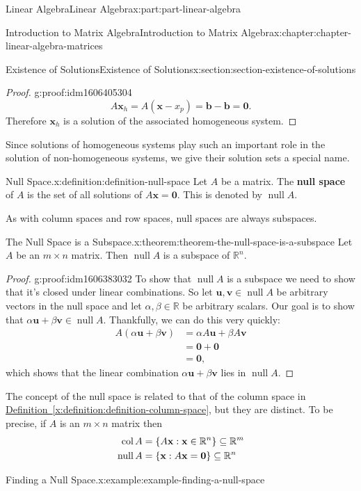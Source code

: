 \documentclass[twoside,10pt,]{book}
\newcommand{\xreffont}{\relax}
\newcommand{\terminology}[1]{\textbf{#1}}
\numberwithin{equation}{part}
\newcommand{\RR}{\mathbb{R}}
\providecommand{\vb}[1]{\mathbf{#1}}
\newcommand{\col}[1]{\operatorname{col}{#1}}
\newcommand{\nul}[1]{\operatorname{null}{#1}}
\begin{document}
\begin{partptx}{Linear Algebra}{}{Linear Algebra}{}{}{x:part:part-linear-algebra}
\begin{chapterptx}{Introduction to Matrix Algebra}{}{Introduction to Matrix Algebra}{}{}{x:chapter:chapter-linear-algebra-matrices}
\begin{sectionptx}{Existence of Solutions}{}{Existence of Solutions}{}{}{x:section:section-existence-of-solutions}
\begin{proof}{}{g:proof:idm1606405304}
\begin{equation*}
A\vb{x}_{h} = A(\vb{x}-x_{p}) = \vb{b} - \vb{b} = \vb{0}.
\end{equation*}
Therefore \(\vb{x}_{h}\) is a solution of the associated homogeneous system.%
\end{proof}
Since solutions of homogeneous systems play such an important role in the solution of non-homogeneous systems, we give their solution sets a special name.%
\begin{definition}{Null Space.}{x:definition:definition-null-space}%
%
Let \(A\) be a matrix. The \terminology{null space} of \(A\) is the set of all solutions of \(A\vb{x} = \vb{0}\). This is denoted by \(\nul{A}\).%
\end{definition}
As with column spaces and row spaces, null spaces are always subspaces.%
\begin{theorem}{The Null Space is a Subspace.}{}{x:theorem:theorem-the-null-space-is-a-subspace}%
Let \(A\) be an \(m\times n\) matrix. Then \(\nul{A}\) is a subspace of \(\RR^n\).%
\end{theorem}
\begin{proof}{}{g:proof:idm1606383032}
To show that \(\nul{A}\) is a subspace we need to show that it's closed under linear combinations. So let \(\vb{u},\vb{v}\in\nul{A}\) be arbitrary vectors in the null space and let \(\alpha,\beta\in\RR\) be arbitrary scalars. Our goal is to show that \(\alpha\vb{u} + \beta\vb{v}\in\nul{A}\). Thankfully, we can do this very quickly:%
\begin{align*}
A(\alpha\vb{u} + \beta\vb{v}) &= \alpha A\vb{u} + \beta A\vb{v}\\
&= \vb{0} + \vb{0} \\
&= \vb{0}, 
\end{align*}
which shows that the linear combination \(\alpha\vb{u}+\beta\vb{v}\) lies in \(\nul{A}\).%
\end{proof}
The concept of the null space is related to that of the column space in \hyperref[x:definition:definition-column-space]{Definition~{\xreffont\ref{x:definition:definition-column-space}}}, but they are distinct. To be precise, if \(A\) is an \(m\times n\) matrix then%
\begin{align*}
\col{A} &= \qty{A\vb{x} : \vb{x}\in\RR^n} \subseteq \RR^{m} \\
\nul{A} &= \qty{\vb{x} : A\vb{x} = \vb{0}} \subseteq \RR^{n} 
\end{align*}
%
\begin{example}{Finding a Null Space.}{x:example:example-finding-a-null-space}%

\end{example}
\end{sectionptx}
\end{chapterptx}
\end{partptx}
\end{document}
